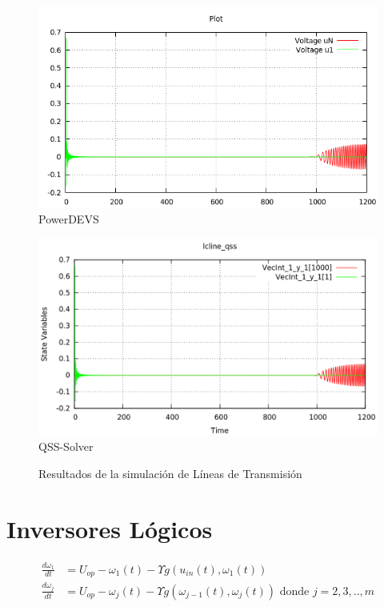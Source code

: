\documentclass{beamer}
\begin{document}
\begin{frame}
\begin{figure}[H]
\centering
\begin{minipage}{0.5\textwidth}
\includegraphics[width=\linewidth]{lcline-pd}
PowerDEVS\\
\end{minipage}\hfill
\begin{minipage}{0.5\textwidth}
 \includegraphics[width=\linewidth]{lcline-qss}
QSS-Solver\\
\end{minipage}
\caption{Resultados de la simulación de Líneas de Transmisión}
\label{graph:lclines}
\end{figure}
\end{frame}


\section{Inversores Lógicos}
\begin{frame}
\begin{align*}
\frac{d \omega_1}{d t} & = U_{op} - \omega_1(t) - \Upsilon g (u_{in}(t), \omega_{1} (t))    \\
\frac{d \omega_j}{d t} & = U_{op} - \omega_j(t) - \Upsilon g (\omega_{j-1}(t), \omega_{j} (t)) \textrm{ donde $j = 2, 3, .., m$}
\end{align*}
\end{frame}
\end{document}
